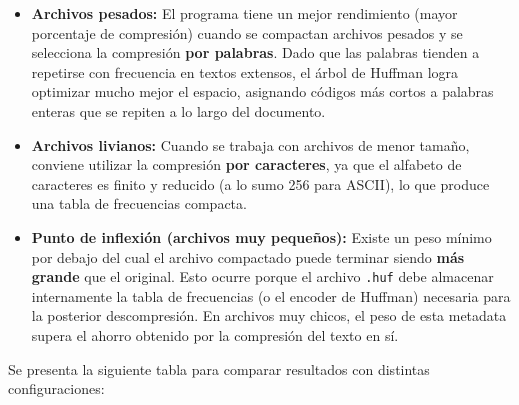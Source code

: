 \begin{itemize}
    \item \textbf{Archivos pesados:} El programa tiene un mejor rendimiento (mayor porcentaje de compresión) cuando se compactan archivos pesados y se selecciona la compresión \textbf{por palabras}. Dado que las palabras tienden a repetirse con frecuencia en textos extensos, el árbol de Huffman logra optimizar mucho mejor el espacio, asignando códigos más cortos a palabras enteras que se repiten a lo largo del documento.

    \item \textbf{Archivos livianos:} Cuando se trabaja con archivos de menor tamaño, conviene utilizar la compresión \textbf{por caracteres}, ya que el alfabeto de caracteres es finito y reducido (a lo sumo 256 para ASCII), lo que produce una tabla de frecuencias compacta.

    \item \textbf{Punto de inflexión (archivos muy pequeños):} Existe un peso mínimo por debajo del cual el archivo compactado puede terminar siendo \textbf{más grande} que el original. Esto ocurre porque el archivo \texttt{.huf} debe almacenar internamente la tabla de frecuencias (o el encoder de Huffman) necesaria para la posterior descompresión. En archivos muy chicos, el peso de esta metadata supera el ahorro obtenido por la compresión del texto en sí.
\end{itemize}

Se presenta la siguiente tabla para comparar resultados con distintas configuraciones:

